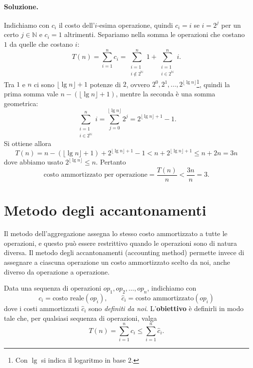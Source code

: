 \paragraph{Soluzione.}
Indichiamo con $c_i$ il costo dell'$i$-esima operazione, quindi $c_i = i$ se $i = 2^j$ per un certo $j \in \mathbb{N}$ e $c_i = 1$ altrimenti. Separiamo nella somma le operazioni che costano $1$ da quelle che costano $i$:
\[
T(n) = \sum_{i=1}^{n} c_i = \sum_{\substack{i=1 \\ i \notin 2^{\mathbb{N}}}}^{n} 1 + \sum_{\substack{i=1 \\ i \in 2^{\mathbb{N}}}}^{n} i.
\]
Tra $1$ e $n$ ci sono $\lfloor \lg n \rfloor + 1$ potenze di $2$, ovvero $2^0, 2^1,\dots,2^{\lfloor \lg n\rfloor}$\footnote{Con $\lg$ si indica il logaritmo in base $2$.}, quindi la prima somma vale $n - (\lfloor \lg n \rfloor + 1)$, mentre la seconda è una somma geometrica:
\[
\sum_{\substack{i=1 \\ i \in 2^{\mathbb{N}}}}^{n} i = \sum_{j=0}^{\lfloor \lg n \rfloor} 2^j = 2^{\lfloor \lg n \rfloor + 1} - 1.
\]
Si ottiene allora
\[
T(n) = n - (\lfloor \lg n \rfloor + 1) + 2^{\lfloor \lg n \rfloor + 1} - 1 < n + 2^{\lfloor \lg n \rfloor + 1} \le n + 2n = 3n
\]
dove abbiamo usato $2^{\lfloor \lg n \rfloor} \le n$. Pertanto
\[
\text{costo ammortizzato per operazione} = \frac{T(n)}{n} < \frac{3n}{n} = 3.
\]

\section{Metodo degli accantonamenti}\label{sec:accantonamenti}
Il metodo dell'aggregazione assegna lo stesso costo ammortizzato a tutte le operazioni, e questo può essere restrittivo quando le operazioni sono di natura diversa. Il metodo degli accantonamenti (accounting method) permette invece di assegnare a ciascuna operazione un costo ammortizzato scelto da noi, anche diverso da operazione a operazione.

\begin{definizione}\label{def:accantonamenti}
Data una sequenza di operazioni $op_1, op_2, \dots, op_n$, indichiamo con
\[
c_i = \text{costo reale}(op_i), \qquad \hat{c}_i = \text{costo ammortizzato}(op_i)
\]
dove i costi ammortizzati $\hat{c}_i$ sono \emph{definiti da noi}. L'\textbf{obiettivo} è definirli in modo tale che, per qualsiasi sequenza di operazioni, valga
\[
T(n) = \sum_{i=1}^{n} c_i \le \sum_{i=1}^{n} \hat{c}_i.
\]
\end{definizione}

